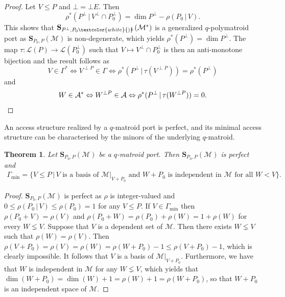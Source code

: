 \documentclass[onecolumn,draftclsnofoot,12pt]{IEEEtran}
\newcommand{\M}{\mathcal{M}}
\theoremstyle{plain} %
\newtheorem{theorem}{Theorem}
\theoremstyle{definition}
\begin{document}
\begin{proof}
    Let $V\leq P$ and $\bot = \bot E$. Then
    $$
        \rho^*(P^\perp\,|\, V^\perp \cap P_0^\perp) = \dim P^\perp - \rho(P_0\,|\, V).
    $$
    This shows that $\mathbf{S}_{P^{\perp},P_0\textcolor{white}{)}\hspace{-1.5mm}^{\perp}}(\mathcal{M}^*)$ is a generalized $q$-polymatroid port as $\mathbf{S}_{P_0,P}(\mathcal{M})$ is non-degenerate, which yields $\rho^*(P^\perp) = \dim P^\perp$. The map $\tau \colon \mathcal{L}(P)\rightarrow \mathcal{L}(P_0^\perp)$ such that $V\mapsto V^\perp\cap P_0^\perp$ is then an anti-monotone bijection and the result follows as
    \[
    V\in \Gamma^* \Leftrightarrow V^{\perp P}\in \Gamma \Leftrightarrow \rho^*(P^\perp\,|\, \tau(V^{\perp P})) = \rho^*(P^\perp)
    \]
    and
    \[
    W\in \mathcal{A}^* \Leftrightarrow W^{\perp P}\in \mathcal{A} \Leftrightarrow \rho^*(P^\perp\,|\, \tau(W^{\perp P})) =0.
   \qedhere \]
    \end{proof}


    
An access structure realized by a $q$-matroid port is perfect, and its minimal access structure can be characterised by the minors of the underlying $q$-matroid.
\begin{theorem}\label{thm:qmatroidports} Let $\mathbf{S}_{P_0,P}(\mathcal{M})$ be a $q$-matroid port. Then $\mathbf{S}_{P_0,P}(\mathcal{M})$ is perfect and \begin{align*}
    \Gamma_{\min} = \{V\leq P \,|\, V \text{ is a basis of } \M|_{V+P_0} \text{ and } W+P_0 \text{ is independent in }\M\text{ for all } W<V\}.
    \end{align*}
\end{theorem}
\begin{proof}
$\mathbf{S}_{P_0,P}(\mathcal{M})$ is perfect as $\rho$ is integer-valued and $0\leq \rho(P_0\,|\,V)\leq \rho(P_0) =1$ for any $V\leq P$. 
If $V \in \Gamma_{\min}$ then $\rho(P_0+V)=\rho(V)$ and 
$\rho(P_0+W)=\rho(P_0)+\rho(W)=1+\rho(W)$ for every $W \lneq V$. 
Suppose that $V$ is a dependent set of $\M$. Then there exists $W \lneq V$ such that $\rho(W) = \rho(V)$.
Then $\rho(V+P_0)=\rho(V)=\rho(W) = \rho(W+P_0)-1 \leq \rho(V+P_0)-1$, which is clearly impossible. It follows that $V$ is a basis of $\M|_{V+P_0}$. Furthermore, we have that $W$ is independent in $\M$ for any $W \lneq V$, which yields that 
$\dim(W+P_0) = \dim(W)+1=\rho(W)+1 =\rho(W+P_0)$, so that $W+P_0$ is an independent space of $\M$. 
\end{proof}
\end{document}
